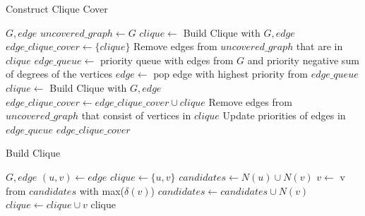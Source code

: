 \begin{algorithm}
\caption{Construct Clique Cover}
\begin{algorithmic}[1]
\REQUIRE $G, edge$
\STATE $uncovered\_graph\gets G$
\STATE $clique\gets$ Build Clique with $G, edge$
\STATE $edge\_clique\_cover\gets \{clique\}$
\STATE Remove edges from $uncovered\_graph$ that are in $clique$
\STATE $edge\_queue\gets$ priority queue with edges from $G$ and priority negative sum of degrees of the vertices
    \STATE $edge\gets$ pop edge with highest priority from $edge\_queue$
    \STATE $clique\gets$ Build Clique with $G, edge$
    \STATE $edge\_clique\_cover\gets edge\_clique\_cover\cup {clique}$
    \STATE Remove edges from $uncovered\_graph$ that consist of vertices in $clique$
    \STATE Update priorities of edges in $edge\_queue$
\ENDWHILE
\RETURN $edge\_clique\_cover$
\end{algorithmic}
\end{algorithm}

\begin{algorithm}
\caption{Build Clique}
\begin{algorithmic}[1]
\REQUIRE $G, edge$
\STATE $(u, v)\gets edge$
\STATE $clique\gets \{u, v\}$
\STATE $candidates\gets N(u)\cup N(v)$
    \STATE $v\gets$ v from $candidates$ with max($\delta(v)$)
    \STATE $candidates\gets candidates\cup N(v)$
    \STATE $clique\gets clique\cup {v}$
\ENDWHILE
\RETURN clique
\end{algorithmic}
\end{algorithm}

